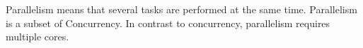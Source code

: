 Parallelism means that several tasks are performed at the same time. Parallelism is a subset of Concurrency. In contrast to concurrency, parallelism requires multiple cores.
